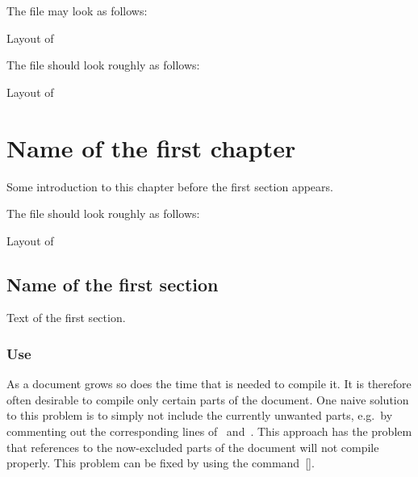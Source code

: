 %
The file  may look as follows:
%
\begin{showcode}{Layout of }

\usepackage{mathtools}
\usepackage{amssymb}

\usepackage{tikz-cd}


\DeclareMathOperator{\End}{End}
\DeclareMathOperator{\Hom}{Hom}
\end{showcode}
%
The file  should look roughly as follows:
%
\begin{showcode}{Layout of }
\chapter{Name of the first chapter}

Some introduction to this chapter before the first section appears.



\end{showcode}
%
The file  should look roughly as follows:
%
\begin{showcode}{Layout of }
\section{Name of the first section}

Text of the first section.
\end{showcode}



\subsection{Use }

As a document grows so does the time that is needed to compile it.
It is therefore often desirable to compile only certain parts of the document.
One naive solution to this problem is to simply not include the currently unwanted parts, e.g.\ by commenting out the corresponding lines of~ and~.
This approach has the problem that references to the now-excluded parts of the document will not compile properly.
This problem can be fixed by using the command~[\comname].

